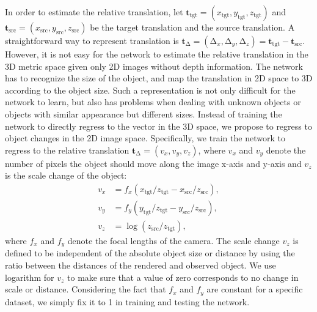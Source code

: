 \documentclass[twocolumn]{svjour3}
\begin{document}
In order to estimate the relative translation, let $\mathbf{t}_{\text{tgt}}=(x_{\text{tgt}}, y_{\text{tgt}}, z_{\text{tgt}})$ and $\mathbf{t}_{\text{src}}=(x_{\text{src}}, y_{\text{src}}, z_{\text{src}})$ be the target translation and the source translation. A straightforward way to represent translation is  $\mathbf{t}_\mathrm{\Delta} = (\mathrm{\Delta}_x, \mathrm{\Delta}_y, \mathrm{\Delta}_z) = \mathbf{t}_{\text{tgt}} - \mathbf{t}_{\text{src}} $. However, it is not easy for the network to estimate the relative translation in the 3D metric space given only 2D images without depth information. The network has to recognize the size of the object, and map the translation in 2D space to 3D according to the object size. Such a representation is not only difficult for the network to learn, but also has problems when dealing with unknown objects or objects with similar appearance but different sizes. Instead of training the network to directly regress to the vector in the 3D space, we propose to regress to object changes in the 2D image space. Specifically, we train the network to regress to the relative translation $\mathbf{t}_\mathrm{\Delta} = (v_x, v_y, v_z)$, where $v_x$ and $v_y$ denote the number of pixels the object should move along the image x-axis and y-axis and $v_z$ is  the scale change of the object:
\begin{equation}
\begin{split}
v_x &= f_x (x_{\text{tgt}} / z_{\text{tgt}} - x_{\text{src}} / z_{\text{src}}), \\
v_y &= f_y (y_{\text{tgt}} / z_{\text{tgt}} - y_{\text{src}} / z_{\text{src}}), \\
v_z &= \log(z_{\text{src}} / z_{\text{tgt}}),
\end{split}
\label{eq.2d_translation}
\end{equation}
where $f_x$ and $f_y$ denote the focal lengths of the camera. The scale change $v_z$ is defined to be independent of the absolute object size or distance by using the ratio between the distances of the rendered and observed object. We use logarithm for $v_z$ to make sure that a value of zero corresponds to no change in scale or distance. Considering the fact that $f_x$ and $f_y$ are constant for a specific dataset, we simply fix it to 1 in training and testing the network.

\end{document}
